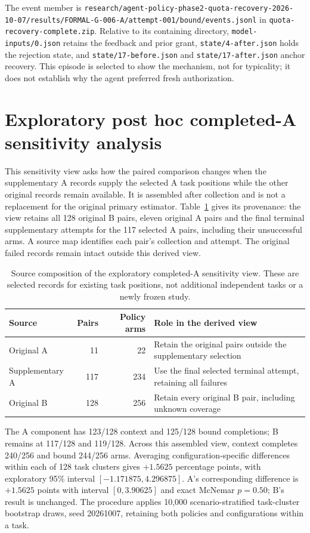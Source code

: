 \documentclass[11pt,a4paper]{article}
\newcommand{\code}[1]{\nolinkurl{#1}}
\begin{document}
The event member is \code{research/agent-policy-phase2-quota-recovery-2026-10-07/results/FORMAL-G-006-A/attempt-001/bound/events.jsonl} in \code{quota-recovery-complete.zip}. Relative to its containing directory, \code{model-inputs/0.json} retains the feedback and prior grant, \code{state/4-after.json} holds the rejection state, and \code{state/17-before.json} and \code{state/17-after.json} anchor recovery. This episode is selected to show the mechanism, not for typicality; it does not establish why the agent preferred fresh authorization.

\section{Exploratory post hoc completed-A sensitivity analysis}
\label{app:completed-a-sensitivity}
This sensitivity view asks how the paired comparison changes when the supplementary A records supply the selected A task positions while the other original records remain available. It is assembled after collection and is not a replacement for the original primary estimator. Table~\ref{tab:sensitivity-sources} gives its provenance: the view retains all 128 original B pairs, eleven original A pairs and the final terminal supplementary attempts for the 117 selected A pairs, including their unsuccessful arms. A source map identifies each pair's collection and attempt. The original failed records remain intact outside this derived view.

\begin{table}[htbp]
\centering\small
\caption{Source composition of the exploratory completed-A sensitivity view. These are selected records for existing task positions, not additional independent tasks or a newly frozen study.}\label{tab:sensitivity-sources}
\begin{tabularx}{\textwidth}{@{}lrrX@{}}
\toprule
Source & Pairs & Policy arms & Role in the derived view \\
\midrule
Original A & 11 & 22 & Retain the original pairs outside the supplementary selection \\
Supplementary A & 117 & 234 & Use the final selected terminal attempt, retaining all failures \\
Original B & 128 & 256 & Retain every original B pair, including unknown coverage \\
\bottomrule
\end{tabularx}
\end{table}

The A component has 123/128 context and 125/128 bound completions; B remains at 117/128 and 119/128. Across this assembled view, context completes 240/256 and bound 244/256 arms. Averaging configuration-specific differences within each of 128 task clusters gives $+1.5625$ percentage points, with exploratory 95\% interval $[-1.171875,4.296875]$. A's corresponding difference is $+1.5625$ points with interval $[0,3.90625]$ and exact McNemar $p=0.50$; B's result is unchanged. The procedure applies 10,000 scenario-stratified task-cluster bootstrap draws, seed 20261007, retaining both policies and configurations within a task.
\end{document}
